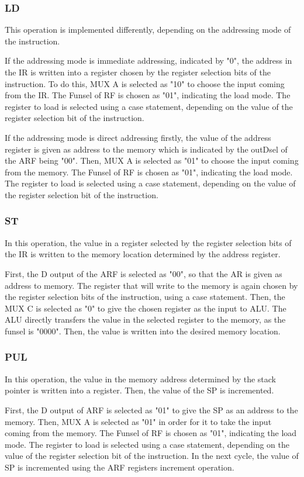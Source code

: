 \documentclass[pdftex,12pt,a4paper]{article}
\begin{document}
\subsubsection{LD}
This operation is implemented differently, depending on the addressing mode of the instruction.

If the addressing mode is immediate addressing, indicated by "0", the address in the IR is written into a register
chosen by the register selection bits of the instruction. To do this, MUX A is selected as "10" to choose the input 
coming from the IR. The Funsel of RF is chosen as "01", indicating the load mode. The register to load is selected 
using a case statement, depending on the value of the register selection bit of the instruction.


If the addressing mode is direct addressing firstly, the value of the address register is given as address to the 
memory which is indicated by the outDsel of the ARF being "00". Then, MUX A is selected as "01" to choose the input 
coming from the memory. The Funsel of RF is chosen as "01", indicating the load mode. The register to load is selected 
using a case statement, depending on the value of the register selection bit of the instruction.

\subsubsection{ST}
In this operation, the value in a register selected by the register selection bits of the IR is written to the memory
location determined by the address register. 

First, the D output of the ARF is selected as "00", so that the AR is given as address to memory. The register that 
will write to the memory is again chosen by the register selection bits of the instruction, using a case statement.
Then, the MUX C is selected as "0" to give the chosen register as the input to ALU. The ALU directly transfers the 
value in the selected register to the memory, as the funsel is "0000". Then, the value is written into the desired
memory location.

\subsubsection{PUL}
In this operation, the value in the memory address determined by the stack pointer is written into a register. 
Then, the value of the SP is incremented.

First, the D output of ARF is selected as "01" to give the SP as an address to the memory. Then, MUX A is selected
as "01" in order for it to take the input coming from the memory. The Funsel of RF is chosen as "01", indicating the
load mode. The register to load is selected using a case statement, depending on the value of the register selection
bit of the instruction. In the next cycle, the value of SP is incremented using the ARF registers increment operation.
\end{document}
